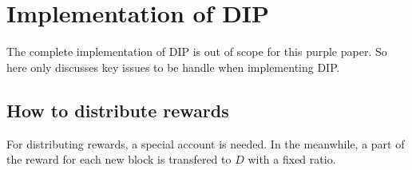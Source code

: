\section{Implementation of DIP}
The complete implementation of DIP is out of scope for this purple paper. So here only discusses key issues to be handle when implementing DIP.

\subsection{How to distribute rewards}
For distributing rewards, a special account is needed. In the meanwhile, a part of the reward for each new block is transfered to $D$ with a fixed ratio.